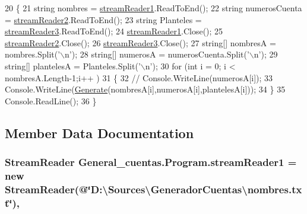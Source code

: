\begin{DoxyCode}
20         \{
21             \textcolor{keywordtype}{string} nombres = \hyperlink{class_general__cuentas_1_1_program_a0af8127c156f60c5b3dcaf870b8a3e95}{streamReader1}.ReadToEnd();
22             \textcolor{keywordtype}{string} numerosCuenta = \hyperlink{class_general__cuentas_1_1_program_ae5b014ec3c416ce64f622ba554226c7d}{streamReader2}.ReadToEnd();
23             \textcolor{keywordtype}{string} Planteles = \hyperlink{class_general__cuentas_1_1_program_a558196b9a618e6a6fb5ac25915910e96}{streamReader3}.ReadToEnd();
24             \hyperlink{class_general__cuentas_1_1_program_a0af8127c156f60c5b3dcaf870b8a3e95}{streamReader1}.Close();
25             \hyperlink{class_general__cuentas_1_1_program_ae5b014ec3c416ce64f622ba554226c7d}{streamReader2}.Close();
26             \hyperlink{class_general__cuentas_1_1_program_a558196b9a618e6a6fb5ac25915910e96}{streamReader3}.Close();
27             \textcolor{keywordtype}{string}[] nombresA = nombres.Split(\textcolor{charliteral}{'\(\backslash\)n'});
28             \textcolor{keywordtype}{string}[] numerosA = numerosCuenta.Split(\textcolor{charliteral}{'\(\backslash\)n'});
29             \textcolor{keywordtype}{string}[] plantelesA = Planteles.Split(\textcolor{charliteral}{'\(\backslash\)n'});
30             \textcolor{keywordflow}{for} (\textcolor{keywordtype}{int} i = 0; i < nombresA.Length-1;i++ )
31             \{
32                \textcolor{comment}{// Console.WriteLine(numerosA[i]);}
33                 Console.WriteLine(\hyperlink{class_general__cuentas_1_1_program_a1ca37b8c6158c753bb77f8ecfa694c00}{Generate}(nombresA[i],numerosA[i],plantelesA[i]));
34             \}
35             Console.ReadLine();
36         \}
\end{DoxyCode}


\subsection{Member Data Documentation}
\hypertarget{class_general__cuentas_1_1_program_a0af8127c156f60c5b3dcaf870b8a3e95}{
\subsubsection[{stream\-Reader1}]{\setlength{\rightskip}{0pt plus 5cm}Stream\-Reader General\-\_\-cuentas.\-Program.\-stream\-Reader1 = new Stream\-Reader(@\char`\"{}D\-:\textbackslash{}\-Sources\textbackslash{}\-Generador\-Cuentas\textbackslash{}nombres.\-txt\char`\"{})\hspace{0.3cm}{\ttfamily [static]}, {\ttfamily [private]}}}\label{class_general__cuentas_1_1_program_a0af8127c156f60c5b3dcaf870b8a3e95}


